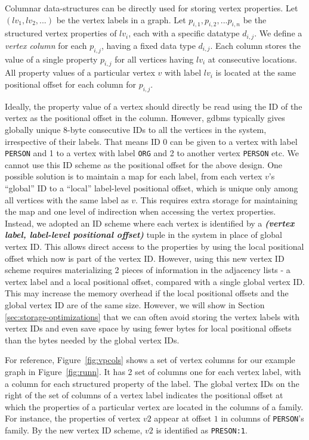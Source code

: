 Columnar data-structures can be directly used for storing vertex properties. Let $(lv_1, lv_2, ...)$ be the vertex labels in a graph. Let $p_{i,1},  p_{i,2}, ... p_{i, n}$ be the structured vertex properties of $lv_i$, each with a specific datatype $d_{i,j}$. We define a \emph{vertex column} for each $p_{i,j}$, having a fixed data type $d_{i,j}$. Each column stores the value of a single property $p_{i,j}$ for all vertices having $lv_i$ at consecutive locations. All property values of a particular vertex $v$ with label $lv_i$ is located at the same positional offset for each column for $p_{i,j}$. 


Ideally, the property value of a vertex should directly be read using the ID of the vertex as the positional offset in the column. However, \gls{gdbms} typically gives globally unique 8-byte consecutive IDs to all the vertices in the system, irrespective of their labels. That means ID 0 can be given to a vertex with label \texttt{PERSON} and 1 to a vertex with label \texttt{ORG} and 2 to another vertex \texttt{PERSON} etc. We cannot use this ID scheme as the positional offset for the above design. One possible solution is to maintain a map for each label, from each vertex $v$'s \enquote{global} ID to a \enquote{local} label-level positional offset, which is unique only among all vertices with the same label as $v$. This requires extra storage for maintaining the map and one level of indirection when accessing the vertex properties. Instead, we adopted an ID scheme where each vertex is identified by a \emph{\textbf{(vertex label, label-level positional offset)}} tuple in the system in place of global vertex ID. This allows direct access to the properties by using the local positional offset which now is part of the vertex ID. However, using this new vertex ID scheme requires materializing 2 pieces of information in the adjacency lists - a vertex label and a local positional offset, compared with a single global vertex ID. This may increase the memory overhead  if the local positional offsets and the global vertex ID are of the same size. However, we will show in Section \ref{sec:storage-optimizations} that we can often avoid storing the vertex labels with vertex IDs and even save space by using fewer bytes for local positional offsets than the bytes needed by the global vertex IDs.

For reference, Figure~\ref{fig:vpcols} shows a set of vertex columns for our example graph in Figure~\ref{fig:runn}. It has 2 set of columns one for each vertex label, with a column for each structured property of the label. The global vertex IDs on the right of the set of columns of a vertex label indicates the positional offset at which the properties of a particular vertex are located in the columns of a family. For instance, the properties of vertex $v2$ appear at offset $1$ in columns of \texttt{PERSON}'s family. By the new vertex ID scheme, $v2$ is identified as \texttt{PRESON:1}. 



